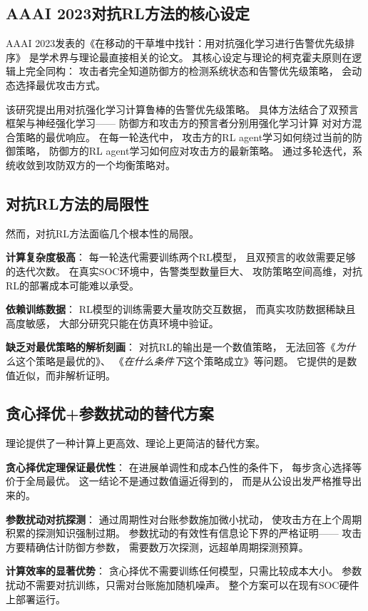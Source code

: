 \documentclass[11pt,a4paper]{article}
\begin{document}
\subsection{AAAI 2023对抗RL方法的核心设定}

AAAI 2023发表的《在移动的干草堆中找针：用对抗强化学习进行告警优先级排序》
是学术界与理论最直接相关的论文。
其核心设定与理论的柯克霍夫原则在逻辑上完全同构：
攻击者完全知道防御方的检测系统状态和告警优先级策略，
会动态选择最优攻击方式。

该研究提出用对抗强化学习计算鲁棒的告警优先级策略。
具体方法结合了双预言框架与神经强化学习——
防御方和攻击方的预言者分别用强化学习计算
对对方混合策略的最优响应。
在每一轮迭代中，
攻击方的RL agent学习如何绕过当前的防御策略，
防御方的RL agent学习如何应对攻击方的最新策略。
通过多轮迭代，系统收敛到攻防双方的一个均衡策略对。

\subsection{对抗RL方法的局限性}

然而，对抗RL方法面临几个根本性的局限。

\textbf{计算复杂度极高}：
每一轮迭代需要训练两个RL模型，
且双预言的收敛需要足够的迭代次数。
在真实SOC环境中，告警类型数量巨大、
攻防策略空间高维，对抗RL的部署成本可能难以承受。

\textbf{依赖训练数据}：
RL模型的训练需要大量攻防交互数据，
而真实攻防数据稀缺且高度敏感，
大部分研究只能在仿真环境中验证。

\textbf{缺乏对最优策略的解析刻画}：
对抗RL的输出是一个数值策略，
无法回答《\textit{为什么}这个策略是最优的》、
《\textit{在什么条件下}这个策略成立》等问题。
它提供的是数值近似，而非解析证明。

\subsection{贪心择优+参数扰动的替代方案}

理论提供了一种计算上更高效、理论上更简洁的替代方案。

\textbf{贪心择优定理保证最优性}：
在进展单调性和成本凸性的条件下，
每步贪心选择等价于全局最优。
这一结论不是通过数值逼近得到的，
而是从公设出发严格推导出来的。

\textbf{参数扰动对抗探测}：
通过周期性对台账参数施加微小扰动，
使攻击方在上个周期积累的探测知识强制过期。
参数扰动的有效性有信息论下界的严格证明——
攻击方要精确估计防御方参数，
需要数万次探测，远超单周期探测预算。

\textbf{计算效率的显著优势}：
贪心择优不需要训练任何模型，只需比较成本大小。
参数扰动不需要对抗训练，只需对台账施加随机噪声。
整个方案可以在现有SOC硬件上部署运行。
\end{document}
